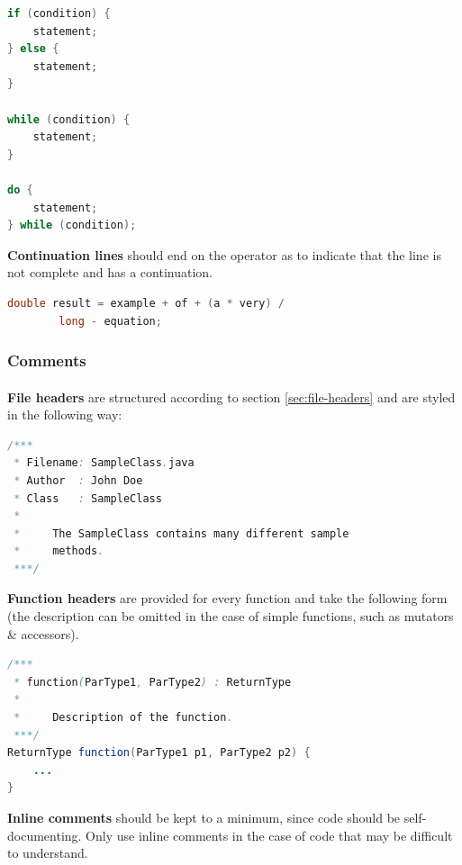 \documentclass{article}
\begin{document}
    \begin{lstlisting}[language=Java]
if (condition) {
    statement;
} else {
    statement;
}

while (condition) {
    statement;
}

do {
    statement;
} while (condition);
    \end{lstlisting}

    \textbf{Continuation lines} should end on the operator as to indicate that
    the line is not complete and has a continuation.

    \begin{lstlisting}[language=Java]
double result = example + of + (a * very) / 
        long - equation;
    \end{lstlisting}

    \subsubsection{Comments}
    \label{sec:java-com}

    \paragraph{}
    \textbf{File headers} are structured according to section
    \ref{sec:file-headers} and are styled in the following way:

    \begin{lstlisting}[language=Java]
/***
 * Filename: SampleClass.java
 * Author  : John Doe
 * Class   : SampleClass
 *
 *     The SampleClass contains many different sample
 *     methods.
 ***/
    \end{lstlisting}

    \textbf{Function headers} are provided for every function and take the
    following form (the description can be omitted in the case of simple
    functions, such as mutators \& accessors).

    \begin{lstlisting}[language=Java]
/***
 * function(ParType1, ParType2) : ReturnType
 *
 *     Description of the function.
 ***/
ReturnType function(ParType1 p1, ParType2 p2) {
    ...
}
    \end{lstlisting}

    \textbf{Inline comments} should be kept to a minimum, since code should be
    self-documenting. Only use inline comments in the case of code that may be
    difficult to understand.

    \newpage
\end{document}
